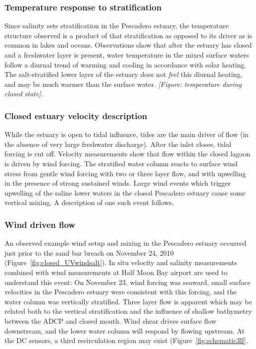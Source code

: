 \subsubsection{Temperature response to stratification} \label{sssec:TempResStrat}

Since salinity sets stratification in the Pescadero estuary, the temperature structure observed is a product of that stratification as opposed to its driver as is common in lakes and oceans. Observations show that after the estuary has closed and a freshwater layer is present, water temperature in the mixed surface waters follow a diurnal trend of warming and cooling in accordance with solar heating. The salt-stratified lower layer of the estuary does not \emph{feel} this diurnal heating, and may be much warmer than the surface water. \emph{[Figure: temperature during closed state].}

\subsubsection{Closed estuary velocity description} \label{cl_vel}
While the estuary is open to tidal influence, tides are the main driver of flow (in the absence of very large freshwater discharge). After the inlet closes, tidal forcing is cut off. Velocity measurements show that flow within the closed lagoon is driven by wind forcing. The stratified water column reacts to surface wind stress from gentle wind forcing with two or three layer flow, and with upwelling in the presence of strong sustained winds. Large wind events which trigger upwelling of the saline lower waters in the closed Pescadero estuary cause some vertical mixing. A description of one such event follows.

\subsubsection{Wind driven flow} \label{sssec:WindMixNov10}

An observed example wind setup and mixing in the Pescadero estuary occurred just prior to the sand bar breach on November 24, 2010 (Figure~\ref{fig:closed_UVwindsalt}). In situ velocity and salinity measurements combined with wind measurements at Half Moon Bay airport are used to understand this event: 
On November 23, wind forcing was seaward, small surface velocities in the Pescadero estuary were consistent with this forcing, and the water column was vertically stratified. Three layer flow is apparent which may be related both to the vertical stratification and the influence of shallow bathymetry between the ADCP and closed mouth. Wind shear drives surface flow downstream, and the lower water column will respond by flowing upstream. At the DC sensors, a third recirculation region may exist (Figure~\ref{fig:schematic3lf}.


